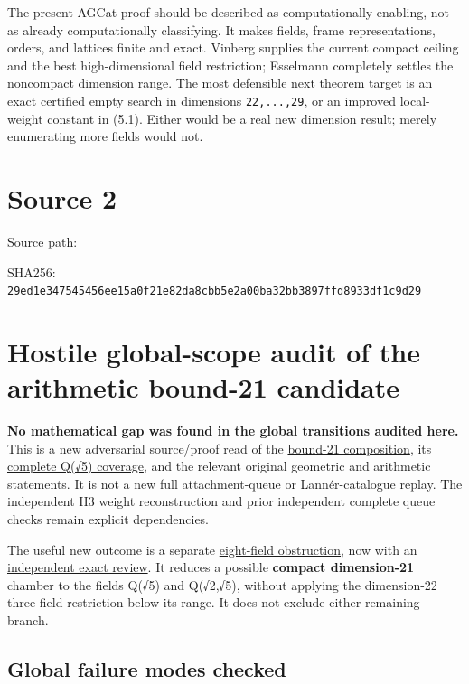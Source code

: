 \documentclass[
  10pt,
]{report}
\begin{document}
The present AGCat proof should be described as computationally enabling,
not as already computationally classifying. It makes fields, frame
representations, orders, and lattices finite and exact. Vinberg supplies
the current compact ceiling and the best high-dimensional field
restriction; Esselmann completely settles the noncompact dimension
range. The most defensible next theorem target is an exact certified
empty search in dimensions \texttt{22,...,29}, or an improved
local-weight constant in (5.1). Either would be a real new dimension
result; merely enumerating more fields would not.

\clearpage

\chapter{Source 2}\label{source-2}

Source path:

SHA256:
\nolinkurl{29ed1e347545456ee15a0f21e82da8cbb5e2a00ba32bb3897ffd8933df1c9d29}

\chapter{Hostile global-scope audit of the arithmetic bound-21
candidate}\label{hostile-global-scope-audit-of-the-arithmetic-bound-21-candidate}

\textbf{No mathematical gap was found in the global transitions audited
here.} This is a new adversarial source/proof read of the
\href{fresh_arithmetic_dimension21_composition_20261016.md}{bound-21
composition}, its
\href{fresh_sqrt5_h3_hub_coverage_20261016.md}{complete Q(√5) coverage},
and the relevant original geometric and arithmetic statements. It is not
a new full attachment-queue or Lannér-catalogue replay. The independent
H3 weight reconstruction and prior independent complete queue checks
remain explicit dependencies.

The useful new outcome is a separate
\href{fresh_arithmetic_high_label_20261016.md}{eight-field obstruction},
now with an
\href{fresh_arithmetic_high_label_20261016_review.md}{independent exact
review}. It reduces a possible \textbf{compact dimension-21} chamber to
the fields Q(√5) and Q(√2,√5), without applying the dimension-22
three-field restriction below its range. It does not exclude either
remaining branch.

\section{Global failure modes
checked}\label{global-failure-modes-checked}
\end{document}
